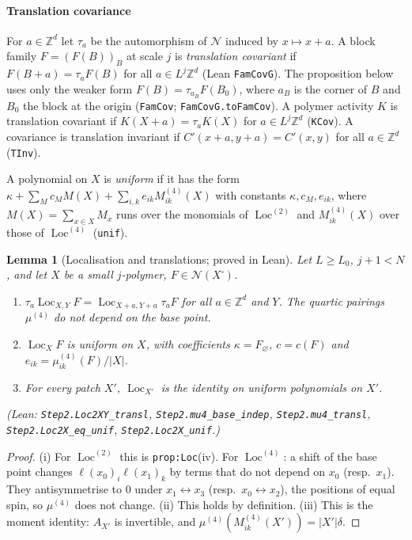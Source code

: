 \documentclass[11pt]{amsart}
\newtheorem{lemma}[theorem]{Lemma}
\theoremstyle{definition}
\theoremstyle{remark}
\numberwithin{equation}{section}
\newcommand{\Z}{\mathbb{Z}}
\newcommand{\cN}{\mathcal{N}}
\newcommand{\Loc}{\operatorname{Loc}}
\begin{document}
\paragraph{Translation covariance}
For $a\in\Z^d$ let $\tau_a$ be the automorphism of $\cN$ induced by $x\mapsto x+a$. A block
family $F=(F(B))_B$ at scale $j$ is \emph{translation covariant} if
$F(B+a)=\tau_aF(B)$ for all $a\in L^j\Z^d$ (Lean \texttt{FamCovG}). The proposition below uses only
the weaker form $F(B)=\tau_{a_B}F(B_0)$, where $a_B$ is the corner of $B$ and $B_0$ the block at the
origin (\texttt{FamCov}; \texttt{FamCovG.toFamCov}). A polymer activity $K$ is translation
covariant if $K(X+a)=\tau_aK(X)$ for $a\in L^j\Z^d$ (\texttt{KCov}). A covariance is translation
invariant if $C'(x+a,y+a)=C'(x,y)$ for all $a\in\Z^d$ (\texttt{TInv}).

A polynomial on $X$ is \emph{uniform} if it has the form
$\kappa+\sum_Mc_MM(X)+\sum_{i,k}e_{ik}M^{(4)}_{ik}(X)$ with constants $\kappa,c_M,e_{ik}$, where
$M(X)=\sum_{x\in X}M_x$ runs over the monomials of $\Loc^{(2)}$ and $M^{(4)}_{ik}(X)$ over those of
$\Loc^{(4)}$ (\texttt{unif}).

\begin{lemma}[Localisation and translations; proved in Lean]\label{lem:loc-tr}
Let $L\ge L_0$, $j+1<N$, and let $X$ be a small $j$-polymer, $F\in\cN(X^\square)$.
\begin{enumerate}
\item[(i)] $\tau_a\Loc_{X,Y}F=\Loc_{X+a,Y+a}\tau_aF$ for all $a\in\Z^d$ and $Y$.
  The quartic pairings $\mu^{(4)}$ do not depend on the base point.
\item[(ii)] $\Loc_XF$ is uniform on $X$, with coefficients $\kappa=F_\varnothing$,
  $c=c(F)$ and $e_{ik}=\mu^{(4)}_{ik}(F)/|X|$.
\item[(iii)] For every patch $X'$, $\Loc_{X'}$ is the identity on uniform polynomials on $X'$.
\end{enumerate}
(Lean: \texttt{Step2.Loc2XY\_transl}, \texttt{Step2.mu4\_base\_indep}, \texttt{Step2.mu4\_transl},
\texttt{Step2.Loc2X\_eq\_unif}, \texttt{Step2.Loc2X\_unif}.)
\end{lemma}

\begin{proof}
(i) For $\Loc^{(2)}$ this is \texttt{prop:Loc}(iv). For $\Loc^{(4)}$: a shift of the base point
changes $\ell(x_0)_i\ell(x_1)_k$ by terms that do not depend on $x_0$ (resp.\ $x_1$). They
antisymmetrise to $0$ under $x_1\leftrightarrow x_3$ (resp.\ $x_0\leftrightarrow x_2$), the
positions of equal spin, so $\mu^{(4)}$ does not change. (ii) This holds by definition.
(iii) This is the moment identity: $A_{X'}$ is invertible, and
$\mu^{(4)}(M^{(4)}_{ik}(X'))=|X'|\delta$.
\end{proof}
\end{document}
